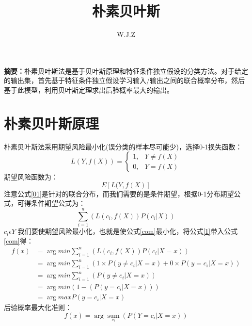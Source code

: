 \documentclass{report}
\title{朴素贝叶斯}
\author{W.J.Z}
\date{}
\begin{document}
	\maketitle
	\textbf{摘要：}朴素贝叶斯法是基于贝叶斯原理和特征条件独立假设的分类方法。对于给定的输出集，首先基于特征条件独立假设学习输入/输出之间的联合概率分布，然后基于此模型，利用贝叶斯定理求出后验概率最大的输出。
	\section{朴素贝叶斯原理}
	朴素贝叶斯法采用期望风险最小化(误分类的样本尽可能少)，选择0-1损失函数：
	\begin{equation}
	L(Y,f(X))=\begin{cases}
	1 , & Y \neq f(X)\\
	0 , & Y = f(X)
	\end{cases}
	\label{1}
	\end{equation}
	期望风险函数为：
	\begin{equation}
	E\left [ L(Y,f(X) \right ]
	\label{01}
	\end{equation}
	注意公式\ref{01}是针对的联合分布，而我们需要的是条件期望，根据0-1分布期望公式，可得条件期望公式为：
	\begin{equation}
	\sum_{i=1}^{n}\left ( L\left ( c_{i},f\left ( X \right ) \right )P\left ( c_{i}|X  \right ) \right )
	\label{com}
	\end{equation}
	$c_{i} \epsilon Y$ 我们要使期望风险最小化，也就是使公式\ref{com}最小化，将公式\ref{1}带入公式\ref{com}得：
	\begin{align*}
	f\left ( x \right ) &= 	 \arg min\sum_{i=1}^{n}\left ( L\left ( c_{i},f\left ( X \right ) \right )P\left ( c_{i}|X=x  \right ) \right )\\
	&= \arg min\sum_{i=1}^{n}\left ( 1 \times P\left ( y\neq c_{i}| X = x \right ) + 0 \times P\left ( y= c_{i}|X=x \right )\right )	\\
	&= \arg min\sum_{i=1}^{n}\left (P\left ( y\neq c_{i}| X = x \right ) \right )\\
	&= \arg min\left ( 1-\left ( P\left ( y= c_{i}| X = x \right ) \right )\right )\\
	&= \arg max P\left ( y= c_{i}| X = x \right ) 
	\end{align*}
	后验概率最大化准则：
	\begin{equation}
	f\left ( x \right )= \arg \mathop{sum}\limits_{c_{i}} \left ( P\left (Y= c_{i}| X = x \right ) \right )
	\end{equation}
\end{document}
